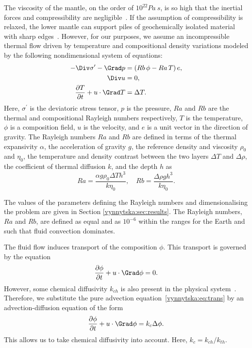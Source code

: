 The viscosity of the mantle, on the order of $10^{22}Pa~s$, is so high
that the inertial forces and compressibility are
negligible~\citep{Ricard2009}. If the assumption of compressibility is
relaxed, the lower mantle can support piles of geochemically isolated
material with sharp edges~\citep{TanGurnis2005}. However, for our
purposes, we assume an incompressible thermal flow driven by
temperature and compositional density variations modeled by the
following nondimensional system of equations:
\begin{align}
  \label{vynnytska:eq:momentum}
  - \Div \sigma^{\prime} - \Grad p
  &=  \left( Rb \, \phi - Ra \, T \right) e,\\
  \label{vynnytska:eq:incompress}
  \Div u & =  0,\\
  \label{vynnytska:eq:energy}
  \frac{\partial T}{\partial t} + u \cdot \Grad T & =  \Delta T.
\end{align}
Here, $\sigma^{\prime}$ is the deviatoric stress tensor, $p$ is the
pressure, $Ra$ and $Rb$ are the thermal and compositional Rayleigh
numbers respectively, $T$ is the temperature, $\phi$ is a
composition field, $u$ is the velocity, and $e$ is a unit vector in
the direction of gravity. The Rayleigh numbers
$Ra$ and $Rb$ are defined in terms of the thermal expansivity
$\alpha$, the acceleration of gravity $g$, the reference density and
viscosity $\rho_0$ and $\eta_0$, the temperature and density contrast
between the two layers $\Delta T$ and $\Delta \rho$, the coefficient
of thermal diffusion $k$, and the depth $h$ as
\begin{equation}
  Ra = \frac{\alpha g \rho_0 \Delta T h^3}{k \eta_0},  \quad
  Rb = \frac{\Delta \rho g h^3}{k \eta_0}.
\end{equation}

The values of the parameters defining the Rayleigh numbers and
dimensionalising the problem are given in
Section \ref{vynnytska:sec:results}. The Rayleigh numbers, $Ra$ and
$Rb$, are defined as equal and as $10^{-6}$ within the ranges for the
Earth \citep{MontagueKelloggManga1998} and such that fluid convection
dominates.

The fluid flow induces transport of the composition
$\phi$. This transport is governed by the equation
\begin{equation}
  \label{vynnytska:eq:trans}
  \frac{\partial \phi}{\partial t} +  u \cdot \Grad \phi = 0.
\end{equation}
However, some chemical diffusivity $k_{ch}$ is also present in the
physical system~\citep{KekenEtAl1997, HansenYuen1988}. Therefore, we
substitute the pure advection equation~\eqref{vynnytska:eq:trans} by
an advection-diffusion equation of the form
\begin{equation}
  \label{vynnytska:eq:transdif}
  \frac{\partial \phi}{\partial t}
  + u  \cdot \Grad \phi =  k_c \Delta \phi .
\end{equation}
This allows us to take chemical diffusivity into account. Here, $k_c =
k_{ch}/k_{th}$.

